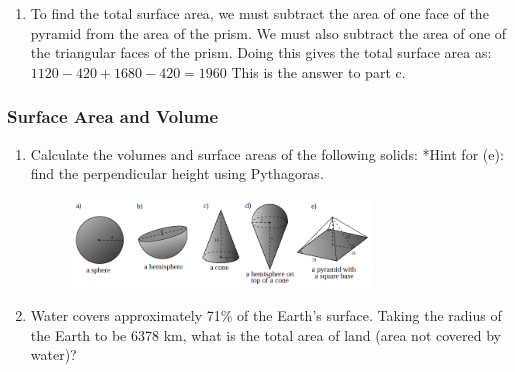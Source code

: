 {\begin{mdframed}[linewidth=4, leftmargin=40, rightmargin=40]
\begin{exercise}
\begin{enumerate}[noitemsep, label=\textbf{Step} \textbf{\arabic*}. ]
\item To find the total surface area, we must subtract the area of one face of the pyramid from the area of the prism. We must also subtract the area of one of the triangular faces of the prism. Doing this gives the total surface area as:
$1120-420+1680-420=1960$ This is the answer to part c.\end{enumerate}
        


    \end{exercise}
    \end{mdframed}
    }
    \noindent
  \label{m39357*secfhsst!!!underscore!!!id508}
            \subsubsection{  Surface Area and Volume }
            \nopagebreak
            
      \label{m39357*id63805}\begin{enumerate}[noitemsep, label=\textbf{\arabic*}. ] 
            \label{m39357*uid7654}\item Calculate the volumes and surface areas of the following solids: *Hint for (e): find the perpendicular height using Pythagoras.

    \setcounter{subfigure}{0}


	\begin{figure}[H] %
    \begin{center}
    \label{m39357*id63823!!!underscore!!!media}\label{m39357*id63823!!!underscore!!!printimage}\includegraphics[width=300px]{col11306.imgs/m39357_MG11C16_005.png} %
        
      \vspace{2pt}
    \vspace{.1in}
    
    \end{center}

 \end{figure}   

    \addtocounter{footnote}{-0}
            \label{m39357*uid8654}\item Water covers approximately 71\% of the Earth's surface. Taking the radius of the Earth to be 6378 km, what is the total area of land (area not covered by water)?\newline
            
\end{enumerate}
        

